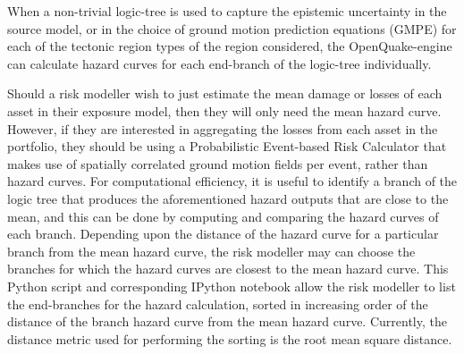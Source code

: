 When a non-trivial logic-tree is used to capture the epistemic uncertainty in the source model, or in the choice of ground motion prediction equations (GMPE) for each of the tectonic region types of the region considered, the OpenQuake-engine can calculate hazard curves for each end-branch of the logic-tree individually. 

Should a risk modeller wish to just estimate the mean damage or losses of each asset in their exposure model, then they will only need the mean hazard curve. However, if they are interested in aggregating the losses from each asset in the portfolio, they should be using a Probabilistic Event-based Risk Calculator that makes use of spatially correlated ground motion fields per event, rather than hazard curves. For computational efficiency, it is useful to identify a branch of the logic tree that produces the aforementioned hazard outputs that are close to the mean, and this can be done by computing and comparing the hazard curves of each branch. Depending upon the distance of the hazard curve for a particular branch from the mean hazard curve, the risk modeller may can choose the branches for which the hazard curves are closest to the mean hazard curve. This Python script and corresponding IPython notebook allow the risk modeller to list the end-branches for the hazard calculation, sorted in increasing order of the distance of the branch hazard curve from the mean hazard curve. Currently, the distance metric used for performing the sorting is the root mean square distance.